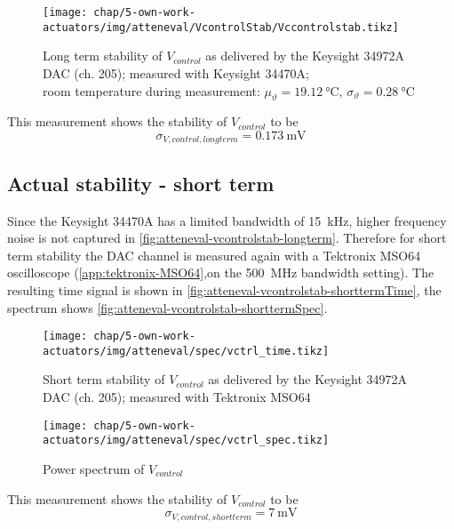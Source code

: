 \begin{figure}[tb]
	\centering
	\texttt{[image: chap/5-own-work-actuators/img/atteneval/VcontrolStab/Vccontrolstab.tikz]}
	\caption{Long term stability of $V_{control}$ as delivered by the Keysight 34972A DAC (ch. 205); measured with Keysight 34470A;\\room temperature during measurement: $\mu_\vartheta=\SI{19.12}{\degreeCelsius}$, $\sigma_\vartheta=\SI{0.28}{\degreeCelsius}$}
	\label{fig:atteneval-vcontrolstab-longterm}
\end{figure}

This measurement shows the stability of $V_{control}$ to be
\begin{equation}
\sigma_{V,control,longterm} = \SI{0.173}{\milli\volt}
\end{equation}

\FloatBarrier
\subsection{Actual stability - short term}\label{sec:atteneval-VcStabST}
Since the Keysight 34470A has a limited bandwidth of \SI{15}{\kHz}, higher frequency noise is not captured in \autoref{fig:atteneval-vcontrolstab-longterm}. Therefore for short term stability the DAC channel is measured again with a Tektronix MSO64 oscilloscope (\autoref{app:tektronix-MSO64},on the \SI{500}{\MHz} bandwidth setting). The resulting time signal is shown in \autoref{fig:atteneval-vcontrolstab-shorttermTime}, the spectrum shows \autoref{fig:atteneval-vcontrolstab-shorttermSpec}.

\begin{figure}[tb]
	\centering
	\texttt{[image: chap/5-own-work-actuators/img/atteneval/spec/vctrl\_time.tikz]}
	\caption{Short term stability of $V_{control}$ as delivered by the Keysight 34972A DAC (ch. 205); measured with Tektronix MSO64}
	\label{fig:atteneval-vcontrolstab-shorttermTime}
\end{figure}

\begin{figure}[tb]
	\centering
	\texttt{[image: chap/5-own-work-actuators/img/atteneval/spec/vctrl\_spec.tikz]}
	\caption{Power spectrum of $V_{control}$}
	\label{fig:atteneval-vcontrolstab-shorttermSpec}
\end{figure}

This measurement shows the stability of $V_{control}$ to be
\begin{equation}
\sigma_{V,control,shortterm} = \SI{7}{\milli\volt}
\end{equation}

